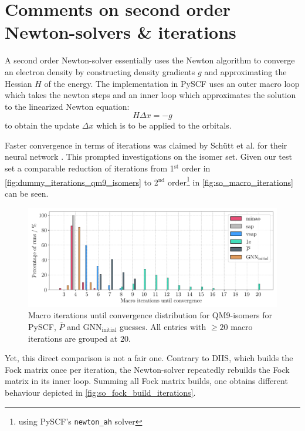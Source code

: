 \section{Comments on second order Newton-solvers \& iterations}
\label{sec:notes_on_so_newton}
A second order Newton-solver essentially uses the Newton algorithm to converge an electron density by constructing density gradients $g$ and approximating the Hessian $H$ of the energy. The implementation in PySCF uses an outer macro loop which takes the newton steps and an inner loop which approximates the solution to the linearized Newton equation:
\[H \Delta x = -g\]
to obtain the update $\Delta x$ which is to be applied to the orbitals.

Faster convergence in terms of iterations was claimed by Schütt et al. for their neural network \parencite{ref:schuett_unifying_2019}. This prompted investigations on the  isomer set. Given our test set a comparable reduction of iterations from 1$^\text{st}$ order in \autoref{fig:dummy_iterations_qm9_isomers} to 2$^\text{nd}$ order\footnote{using PySCF's \texttt{newton\_ah} solver} in \autoref{fig:so_macro_iterations} can be seen. 
\begin{figure}[H]
    \centering
    \includegraphics[width=\textwidth]{../fig/gnn/SO_0D_GNN_model_iteration_count_bar.pdf}
    \caption[Macro iterations until convergence distribution for QM9-isomers]{Macro iterations until convergence distribution for QM9-isomers for PySCF, $\overline{P}$ and GNN$_\text{initial}$ guesses. All entries with $\geq 20$ macro iterations are grouped at $20$.}
    \label{fig:so_macro_iterations}
\end{figure}
Yet, this direct comparison is not a fair one. Contrary to DIIS, which builds the Fock matrix once per iteration, the Newton-solver repeatedly rebuilds the Fock matrix in its inner loop. Summing all Fock matrix builds, one obtains different behaviour depicted in \autoref{fig:so_fock_build_iterations}.  
